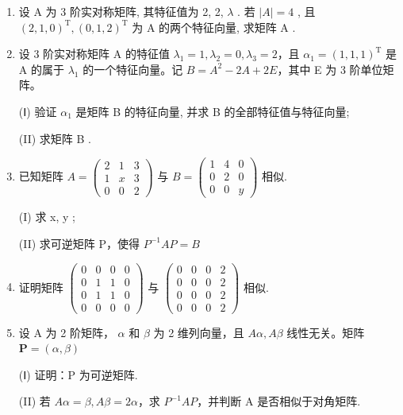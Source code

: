 \documentclass[12pt, a4paper]{ctexart}
\begin{document}
\begin{enumerate}[start=12]
    (Ⅰ) 求 A 的特征值及其对应的特征向量;
    
    (II) 计算 $ A^{2n}\begin{pmatrix}1\\-1\\-3\end{pmatrix} $.

    \item 设 A 为 3 阶实对称矩阵, 其特征值为 2, 2, $\lambda$ . 若 $ |A|=4 $ , 且 $ (2,1,0)^{\mathrm{T}}, (0,1,2)^{\mathrm{T}} $ 为 A 的两个特征向量, 求矩阵 A .

    \item 设 3 阶实对称矩阵 A 的特征值 $ \lambda_1 = 1, \lambda_2 = 0, \lambda_3 = 2 $，且 $ \alpha_1 = (1, 1, 1)^\mathrm{T} $ 是 A 的属于 $ \lambda_1 $ 的一个特征向量。记 $ B = A^2 - 2A + 2E $，其中 E 为 3 阶单位矩阵。
    
    (Ⅰ) 验证 $ \alpha_{1} $ 是矩阵 B 的特征向量, 并求 B 的全部特征值与特征向量;
    
    (II) 求矩阵 B .

    \item 已知矩阵 $ A=\begin{pmatrix}2&1&3\\1&x&3\\0&0&2\end{pmatrix} $ 与 $ B=\begin{pmatrix}1&4&0\\0&2&0\\0&0&y\end{pmatrix} $ 相似.
    
    (I) 求 x, y ;
    
    (II) 求可逆矩阵 P，使得 $ P^{-1}AP=B $

    \item 证明矩阵 $ \begin{pmatrix}0&0&0&0\\0&1&1&0\\0&1&1&0\\0&0&0&0\end{pmatrix} $ 与 $ \begin{pmatrix}0&0&0&2\\0&0&0&2\\0&0&0&2\\0&0&0&2\end{pmatrix} $ 相似.

    \item 设 A 为 2 阶矩阵， $ \alpha $ 和 $ \beta $ 为 2 维列向量，且 $ A\alpha, A\beta $ 线性无关。矩阵 $ \mathbf{P} = (\alpha, \beta) $
    
    (Ⅰ) 证明：P 为可逆矩阵.
    
    (II) 若 $ A\alpha=\beta, A\beta=2\alpha $，求 $ P^{-1}AP $，并判断 A 是否相似于对角矩阵.
\end{enumerate}
\end{document}
